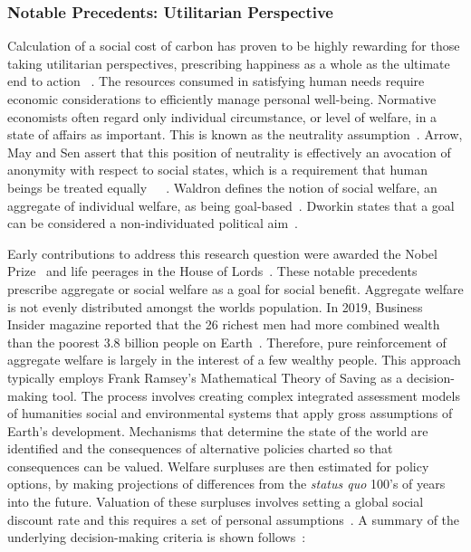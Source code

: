 \documentclass[11pt, oneside]{book}   	%
\begin{document}
\subsubsection{Notable Precedents: Utilitarian Perspective}

Calculation of a social cost of carbon has proven to be highly rewarding for those taking utilitarian perspectives, prescribing happiness as a whole as the ultimate end to action ~\cite{hs1}. The resources consumed in satisfying human needs require economic considerations to efficiently manage personal well-being. Normative economists often regard only individual circumstance, or level of  welfare, in a state of affairs as important. This is known as the neutrality assumption~\cite{pd2}. Arrow, May and Sen assert that this position of neutrality is effectively an avocation of anonymity with respect to social states, which is a requirement that human beings be treated equally~\cite{ka1}~\cite{km1}~\cite{as2}. Waldron defines the notion of social welfare, an aggregate of individual welfare, as being goal-based~\cite{jw2}. Dworkin states that a goal can be considered a non-individuated political aim~\cite{rd1}.

Early contributions to address this research question were awarded the Nobel Prize~\cite{np1} and life peerages in the House of Lords~\cite{g1}. These notable precedents prescribe aggregate or social welfare as a goal for social benefit. Aggregate welfare is not evenly distributed amongst the worlds population. In 2019, Business Insider magazine reported that the 26 richest men had more combined wealth than the poorest 3.8 billion people on Earth~\cite{bi1}. Therefore, pure reinforcement of aggregate welfare is largely in the interest of a few wealthy people. This approach typically employs Frank Ramsey's Mathematical Theory of Saving as a decision-making tool. The process involves creating complex integrated assessment models of humanities social and environmental systems that apply gross assumptions of Earth's development. Mechanisms that determine the state of the world are identified and the consequences of alternative policies charted so that consequences can be valued. Welfare surpluses are then estimated for policy options, by making projections of differences from the \emph{status quo} 100's of years into the future. Valuation of these surpluses involves setting a global social discount rate and this requires a set of personal assumptions~\cite{pd2}. A summary of the underlying decision-making criteria is shown follows~\cite{fr1}:
\end{document}
